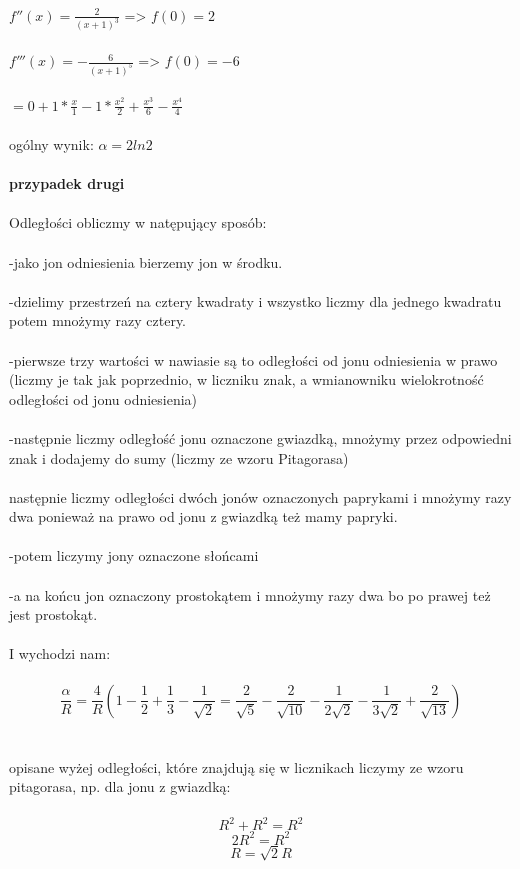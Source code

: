 \\
$f''(x)=\frac{2}{(x+1)^3}$   =>   $f(0)=2$
\\
\\
$f'''(x)=-\frac{6}{(x+1)^5}$   =>   $f(0)=-6$
\\
\\
$=0+1*\frac{x}{1}-1*\frac{x^2}{2}+\frac{x^3}{6}-\frac{x^4}{4}$
\\
\\
ogólny wynik:
$\alpha=2ln2$
\\
\\
\textbf{przypadek drugi}
\\
\\
Odległości obliczmy w natępujący sposób:
\\
\\
-jako jon odniesienia bierzemy jon w środku.
\\
\\
-dzielimy przestrzeń na cztery kwadraty i wszystko liczmy dla jednego kwadratu potem mnożymy razy cztery.
\\
\\
-pierwsze trzy wartości w nawiasie są to odległości od jonu odniesienia w prawo (liczmy je tak jak poprzednio, w liczniku znak, a wmianowniku wielokrotność odległości od jonu odniesienia)
\\
\\
-następnie liczmy odległość jonu oznaczone gwiazdką, mnożymy przez odpowiedni znak i dodajemy do sumy (liczmy ze wzoru Pitagorasa)
\\
\\
następnie liczmy odległości dwóch jonów oznaczonych paprykami i mnożymy razy dwa ponieważ na prawo od jonu z gwiazdką też mamy papryki.
\\
\\
-potem liczymy jony oznaczone słońcami 
\\
\\
-a na końcu jon oznaczony prostokątem i mnożymy razy dwa bo po prawej też jest prostokąt.
\\
\\
I wychodzi nam:
\\
\\
\begin{equation}
\frac{\alpha}{R} =\frac{4}{R}(1-\frac{1}{2}+\frac{1}{3}-\frac{1}{\sqrt{2}}=\frac{2}{\sqrt{5}}-\frac{2}{\sqrt{10}}-\frac{1}{2\sqrt{2}}-\frac{1}{3\sqrt{2}}+\frac{2}{\sqrt{13}})
\end{equation}
\\
\\
opisane wyżej odległości, które znajdują się w licznikach liczymy ze wzoru pitagorasa, np. dla jonu z gwiazdką:
\\
\\
\begin{equation}
R^2+R^2=R^2
\end{equation}
\begin{equation}
2R^2=R^2
\end{equation}
\begin{equation}
R=\sqrt{2}R
\end{equation}
\hrulefill
